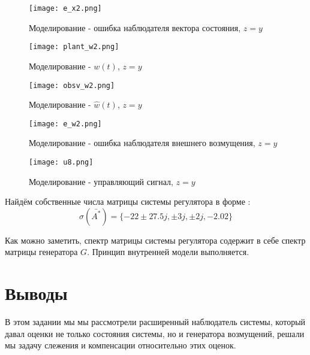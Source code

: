 \begin{figure}[ht]
  \centering
  \texttt{[image: e\_x2.png]}
  \caption{Моделирование - ошибка наблюдателя вектора состояния, $z = y$}
\end{figure}
\newpage
\begin{figure}[ht]
  \centering
  \texttt{[image: plant\_w2.png]}
  \caption{Моделирование - $w(t)$, $z = y$}
\end{figure}


\begin{figure}[ht]
  \centering
  \texttt{[image: obsv\_w2.png]}
  \caption{Моделирование - $\hat{w}(t)$, $z = y$}
\end{figure}

\newpage
\begin{figure}[ht]
  \centering
  \texttt{[image: e\_w2.png]}
  \caption{Моделирование - ошибка наблюдателя внешнего возмущения, $z = y$}
\end{figure}


\begin{figure}[ht]
  \centering
  \texttt{[image: u8.png]}
  \caption{Моделирование - управляющий сигнал, $z = y$}
\end{figure}

Найдём собственные числа матрицы системы регулятора в форме :
$$
  \sigma(\bar{A^*}) = \{ -22 \pm 27.5j, \pm 3j, \pm 2j, -2.02 \}
$$

Как можно заметить, спектр матрицы системы регулятора содержит в себе спектр матрицы генератора $G$. 
Принцип внутренней модели выполняется.



\section{Выводы}

В этом задании мы мы рассмотрели расширенный наблюдатель системы, 
который давал оценки не только состояния системы, но и генератора возмущений, 
решали мы задачу слежения и компенсации относительно этих  оценок.
\endinput